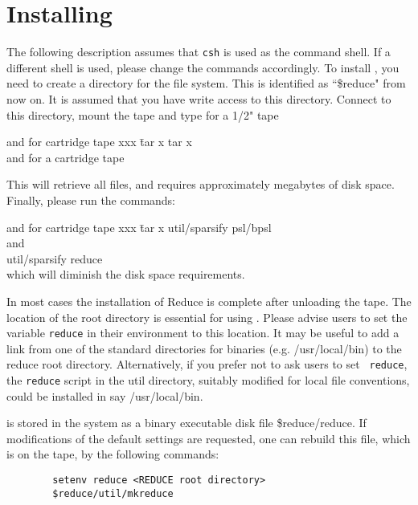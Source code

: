 \section{Installing {\REDUCE}}
The following description assumes that {\tt csh} is used as the command shell.
If a different shell is used, please change the commands accordingly.
To install {\REDUCE}, you need to create a directory for the {\REDUCE} file
system.  This is identified as ``\$reduce" from now on.  It is assumed
that you have write access to this directory.  Connect to this directory,
mount the tape and type for a 1/2" tape
\begin{center}
\begin{tabbing}
and for cartridge tape xxx \= tar x \kill
                                          \> tar x \\
and for a cartridge tape \\
                                          \> {\cartridgecommand}
\end{tabbing}
\end{center}
This will retrieve all files, and requires approximately {\tapespace}
megabytes of disk space.
Finally, please run the commands:
\begin{center}
\begin{tabbing}
and for cartridge tape xxx \= tar x \kill
                                          \> util/sparsify psl/bpsl \\
and \\
                                          \> util/sparsify reduce \\
which will diminish the disk space requirements.
\end{tabbing}
\end{center}

In most cases the installation of Reduce is complete after unloading the
tape.  The location of the {\REDUCE} root directory is essential for using
{\REDUCE}.  Please advise users to set the variable {\tt reduce} in their
environment to this location.  It may be useful to add a link from one of
the standard directories for binaries (e.g. /usr/local/bin) to the reduce
root directory.  Alternatively, if you prefer not to ask users to set {\tt
reduce}, the {\tt reduce} script in the util directory, suitably modified
for local file conventions, could be installed in say /usr/local/bin.

{\REDUCE} is stored in the system as a binary executable disk file 
\$reduce/reduce. 
If modifications of the default settings are requested, one can rebuild 
this file, which is on the tape, by the following commands:
\begin{verbatim}
        setenv reduce <REDUCE root directory>
        $reduce/util/mkreduce
\end{verbatim}

